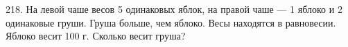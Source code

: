 218. На левой чаше весов 5 одинаковых яблок, на правой чаше --- 1 яблоко и 2 одинаковые груши. Груша больше, чем яблоко. Весы находятся в равновесии. Яблоко весит 100 г. Сколько весит груша?\\
